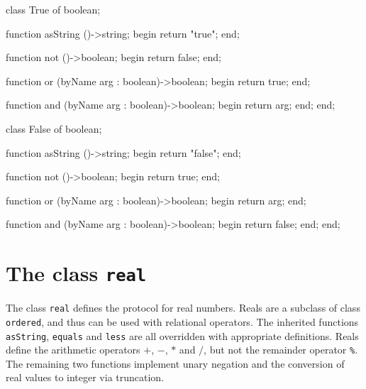 \begin{cprog}

class True of boolean;

	function asString ()->string;
	begin
		return "true";
	end;

	function not ()->boolean;
	begin
		return false;
	end;

	function or (byName arg : boolean)->boolean;
	begin
		return true;
	end;

	function and (byName arg : boolean)->boolean;
	begin
		return arg;
	end;
end;

class False of boolean;

	function asString ()->string;
	begin
		return "false";
	end;

	function not ()->boolean;
	begin
		return true;
	end;

	function or (byName arg : boolean)->boolean;
	begin
		return arg;
	end;

	function and (byName arg : boolean)->boolean;
	begin
		return false;
	end;
end;

\end{cprog}

\section{The class {\tt real}}

The class {\tt real} defines the protocol for real numbers.
Reals are a subclass of class {\tt ordered}, and thus can be used
with relational operators.
The inherited functions {\tt asString}, {\tt equals} and {\tt less}
are all overridden with appropriate definitions.
Reals define the arithmetic operators $+$, $-$, $*$ and $/$, but not
the remainder operator \verb+%+.  The remaining two functions
implement unary negation and the conversion of real values to integer
via truncation.

